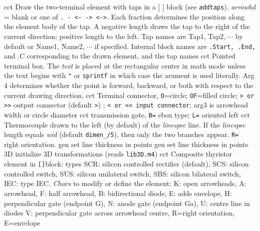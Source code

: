   {cct}
  {Draw the two-terminal element with taps in a [ ] block (see
  {\tt addtaps}).
   {\sl arrowhd} = blank or one of {\tt . - <- -> <->}.  Each fraction
   determines the position along the element body of the tap.  A negative
   length draws the tap to the right of the current direction; positive
   length to the left.  Tap names are Tap1, Tap2, $\cdots$ by default
   or Name1, Name2, $\cdots$ if specified.  Internal block names are
   {\tt .Start, .End,} and {.C} corresponding to the drawn element,
   and the tap names  }
  {cct}
  {Pointed terminal box. The {\sl text} is placed at the rectangular
  center
   in math mode unless the text begins with {\tt "} or {\tt sprintf} in
   which case the arument is used literally.  Arg 4 determines whether
   the point is forward, backward, or both with respect to the current
   drawing direction.
    }
  {cct}
  {Terminal connector, {\tt O}=circle; {\tt OF}=filled circle;
   {\tt > or >>} output connector (default {\tt >}) ; {\tt < or <<
   input connector}; arg3 is arrowhead width or circle diameter
    }
  {cct}
  {transmission gate, {\tt B=} ebox type; {\tt L=} oriented left
    }
  {cct}
  { Thermocouple drawn to the left (by default) of the {\sl
  linespec}
    line.  If the {\sl linespec} length equals {\sl wid} (default
    {\tt dimen\_/5}), then only the two branches appear.  {\tt R=}
    right orientation.  }
  {gen}
  {set line thickness in points}
  {gen}
  {set line thickness in points}
  {3D} {initialize 3D transformations (reads {\tt lib3D.m4})}
  {cct}
  {Composite thyristor element in {\tt []}block:
   types
                                   SCR: silicon controlled rectifier
                                   (default), SCS: silicon controlled
                                   switch, SUS: silicon unilateral switch,
                                   SBS: silicon bilateral switch, IEC:
                                   type IEC.
   {\sl Chars} to modify or define the element:
                                   K: open arrowheads, A: arrowhead, F:
                                   half arrowhead, B: bidirectional diode,
                                   E: adds envelope, H: perpendicular
                                   gate (endpoint G), N: anode gate
                                   (endpoint Ga), U: centre line in diodes
                                 V: perpendicular gate across arrowhead
                                 centre,
                                   R=right orientation, E=envelope
    }
